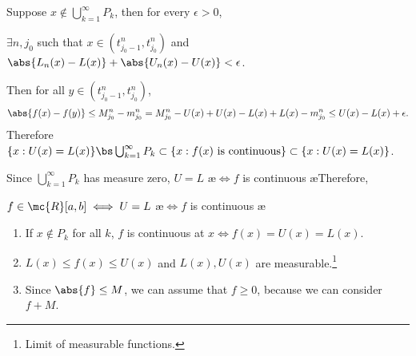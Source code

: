  Suppose \(x \notin \bigcup_{k=1}^{\infty} P_k\), then for every \(\epsilon > 0\),
\begin{center}
    \(\exists n, j_0\) such that \(x \in (t_{j_0-1}^n, t_{j_0}^n)\) and \(\abs{L_n(x) - L(x)} + \abs{U_n(x) - U(x)} < \epsilon\).
\end{center}
Then for all \(y \in (t_{j_0-1}^n, t_{j_0}^n)\),
\[
    \abs{f(x) - f(y)} \leq M_{j_0}^n - m_{j_0}^n = M_{j_0}^n - U(x) + U(x) - L(x) + L(x) - m_{j_0}^n \leq U(x) - L(x) + \epsilon.
\]
Therefore \(\{x : U(x) = L(x)\} \bs \bigcup_{k=1}^{\infty} P_k \subset \{x : f(x) \text{ is continuous}\} \subset \{x : U(x) = L(x)\}\).

Since \(\bigcup_{k=1}^{\infty} P_k\) has measure zero, \(U = L\) \ae \(\iff f\) is continuous \ae Therefore,
\begin{center}
    \(f \in \mc{R}[a, b] \iff U = L\) \ae \(\iff f\) is continuous \ae
\end{center}

\rmk
\begin{enumerate}
    \item If \(x \notin P_k\) for all \(k\), \(f\) is continuous at \(x \iff f(x) = U(x) = L(x)\).
    \item \(L(x) \leq f(x) \leq U(x)\) and \(L(x), U(x)\) are measurable.\footnote{Limit of measurable functions.}
    \item Since \(\abs{f} \leq M\), we can assume that \(f \geq 0\), because we can consider \(f + M\).
\end{enumerate}

\pagebreak
